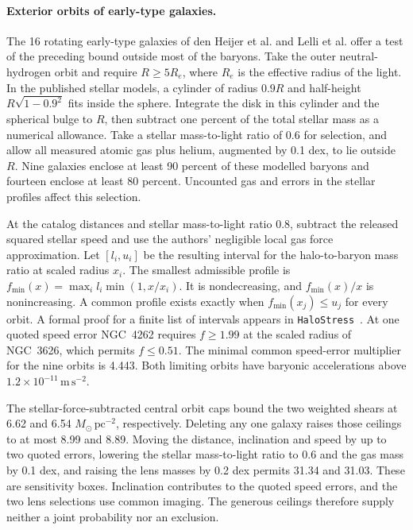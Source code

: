 \documentclass[11pt]{article}
\begin{document}
\paragraph{Exterior orbits of early-type galaxies.}
The 16 rotating early-type galaxies of den Heijer et al. and Lelli et al.
\cite{denheijer2015,lelli2017etg} offer a test of the preceding bound outside
most of the baryons. Take the outer neutral-hydrogen orbit and require
$R\ge5R_e$, where $R_e$ is the effective radius of the light. In the
published stellar models, a cylinder of radius $0.9R$ and half-height
$R\sqrt{1-0.9^2}$ fits inside the sphere. Integrate the disk in this
cylinder and the spherical bulge to $R$, then subtract one percent of the
total stellar mass as a numerical allowance. Take a stellar mass-to-light
ratio of 0.6 for selection, and allow all measured atomic gas plus helium,
augmented by 0.1 dex, to lie outside $R$. Nine galaxies enclose at least
90 percent of these modelled baryons and fourteen enclose at least 80 percent.
Uncounted gas and errors in the stellar profiles affect this selection.

At the catalog distances and stellar mass-to-light ratio 0.8, subtract the
released squared stellar speed and use the authors' negligible local gas
force approximation. Let $[l_i,u_i]$ be the resulting interval for the
halo-to-baryon mass ratio at scaled radius $x_i$. The smallest admissible
profile is $f_{\min}(x)=\max_i l_i\min(1,x/x_i)$. It is nondecreasing,
and $f_{\min}(x)/x$ is nonincreasing. A common profile exists exactly
when $f_{\min}(x_j)\le u_j$ for every orbit. A formal proof for a finite list of intervals appears in \texttt{HaloStress}~\cite{ophlean}. At one quoted speed error
NGC~4262 requires $f\ge1.99$ at the scaled radius of NGC~3626, which
permits $f\le0.51$. The minimal common speed-error multiplier for the
nine orbits is 4.443. Both limiting orbits have baryonic accelerations
above $1.2\times10^{-11}\,\mathrm{m\,s^{-2}}$.

The stellar-force-subtracted central orbit caps bound the two weighted
shears at 6.62 and 6.54 $M_\odot\,\mathrm{pc}^{-2}$, respectively.
Deleting any one galaxy raises those ceilings to at most 8.99 and 8.89.
Moving the distance, inclination and speed by up to two quoted errors,
lowering the stellar mass-to-light ratio to 0.6 and the gas mass by
0.1 dex, and raising the lens masses by 0.2 dex permits 31.34 and 31.03.
These are sensitivity boxes. Inclination contributes to the quoted speed
errors, and the two lens selections use common imaging. The generous
ceilings therefore supply neither a joint probability nor an exclusion.
\end{document}
